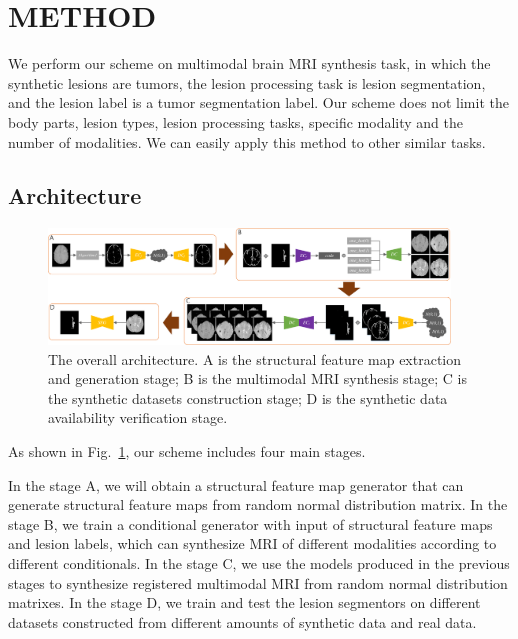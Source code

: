 \documentclass{ecai}
\begin{document}
\section{METHOD}
\label{method}
We perform our scheme on multimodal brain MRI synthesis task, in which the synthetic lesions are tumors, the lesion processing task is lesion segmentation, and the lesion label is a tumor segmentation label. Our scheme does not limit the body parts, lesion types, lesion processing tasks, specific modality and the number of modalities. We can easily apply this method to other similar tasks.

\subsection{Architecture}
\begin{figure}[t]
	\centering
	\includegraphics[width=0.95\textwidth]{figures/architecture}
	\caption{The overall architecture. A is the structural feature map extraction and generation stage; B is the multimodal MRI synthesis stage; C is the synthetic datasets construction stage; D is the synthetic data availability verification stage.}
	\label{architecture}
\end{figure}
As shown in Fig.~\ref{architecture}, our scheme includes four main stages. 

In the stage A, we will obtain a structural feature map generator that can generate structural feature maps from random normal distribution matrix. 
In the stage B, we train a conditional generator with input of structural feature maps and lesion labels, which can synthesize MRI of different modalities according to different conditionals.
In the stage C, we use the models produced in the previous stages to synthesize registered multimodal MRI from random normal distribution matrixes. 
In the stage D, we train and test the lesion segmentors on different datasets constructed from different amounts of synthetic data and real data.
\end{document}
